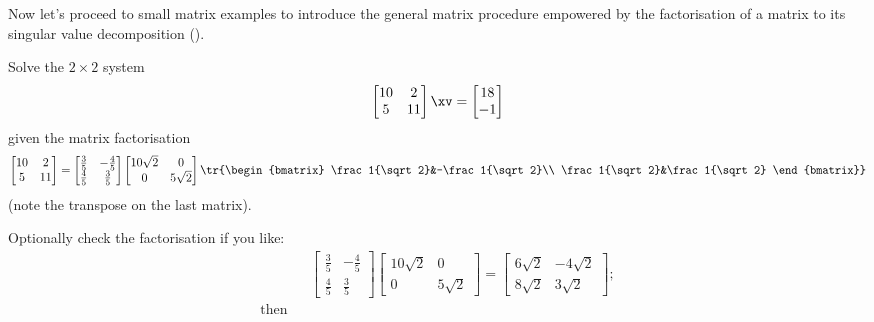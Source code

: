Now let's proceed to small matrix examples to introduce the general matrix procedure empowered by the factorisation of a matrix to its singular value decomposition (\svd).
\begin{example} \label{eg:2by2svd}
Solve the \(2\times2\) system
\begin{equation*}
\begin{bmatrix} 10&2\\5&11 \end{bmatrix}\xv
=\begin{bmatrix} 18\\-1 \end{bmatrix}
\end{equation*}
given the matrix factorisation
\begin{equation*}
\begin{bmatrix} 10&2\\5&11 \end{bmatrix}=
\begin{bmatrix} \frac35&-\frac45\\\frac45&\frac35 \end{bmatrix}
\begin{bmatrix} 10\sqrt2&0\\0&5\sqrt2 \end{bmatrix}
\tr{\begin{bmatrix} \frac1{\sqrt2}&-\frac1{\sqrt2}\\ \frac1{\sqrt2}&\frac1{\sqrt2} \end{bmatrix}}
\end{equation*}
(note the transpose on the last matrix).
\begin{solution} 
Optionally check the factorisation if you like:
\begin{eqnarray*}&&
\begin{bmatrix} \frac35&-\frac45\\\frac45&\frac35 \end{bmatrix}
\begin{bmatrix} 10\sqrt2&0\\0&5\sqrt2 \end{bmatrix}
=\begin{bmatrix} 6{\sqrt2}& -4{\sqrt2}
\\ 8{\sqrt2}&3{\sqrt2} \end{bmatrix};
\\\text{then}&&

\end{eqnarray*}
\end{solution}
\end{example}

